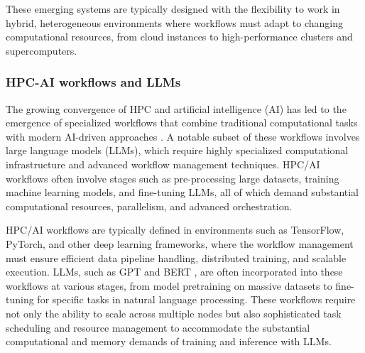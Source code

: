 \documentclass[sigconf]{acmart}
\begin{document}
These emerging systems are typically designed with the flexibility to work in hybrid, heterogeneous environments where workflows must adapt to changing computational resources, from cloud instances to high-performance clusters and supercomputers.

\subsubsection{HPC-AI workflows and LLMs}




The growing convergence of HPC and artificial intelligence (AI) has led to the emergence of specialized workflows that combine traditional computational tasks with modern AI-driven approaches \citep{mcclure2020}. A notable subset of these workflows involves large language models (LLMs), which require highly specialized computational infrastructure and advanced workflow management techniques. HPC/AI workflows often involve stages such as pre-processing large datasets, training machine learning models, and fine-tuning LLMs, all of which demand substantial computational resources, parallelism, and advanced orchestration.

HPC/AI workflows are typically defined in environments such as TensorFlow, PyTorch, and other deep learning frameworks, where the workflow management must ensure efficient data pipeline handling, distributed training, and scalable execution. LLMs, such as GPT \citep{gpt-report} and BERT \cite{bert-report}, are often incorporated into these workflows at various stages, from model pretraining on massive datasets to fine-tuning for specific tasks in natural language processing. These workflows require not only the ability to scale across multiple nodes but also sophisticated task scheduling and resource management to accommodate the substantial computational and memory demands of training and inference with LLMs.
\end{document}
